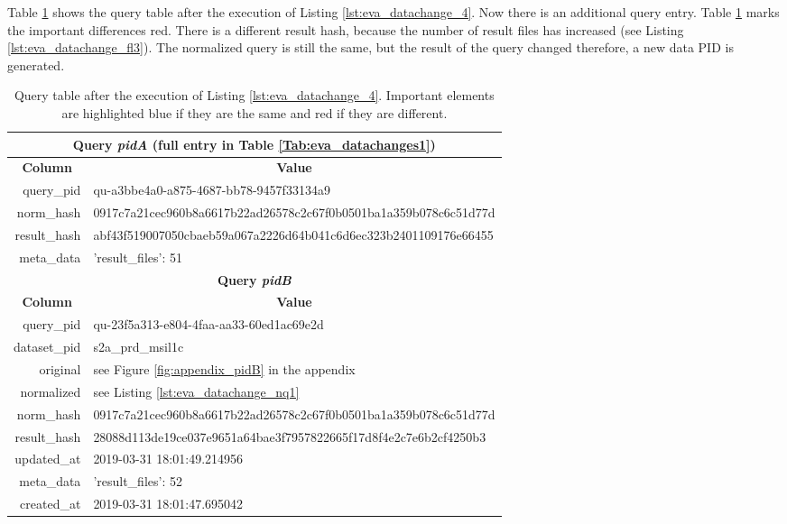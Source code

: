\documentclass[draft,final]{vutinfth} %
\begin{document}
\begin{enumerate}
	Table \ref{Tab:eva_datachanges3} shows the query table after the execution of Listing \ref{lst:eva_datachange_4}. Now there is an additional query entry. Table \ref{Tab:eva_datachanges3} marks the important differences red. There is a different result hash, because the number of result files has increased (see Listing \ref{lst:eva_datachange_fl3}). The normalized query is still the same, but the result of the query changed therefore, a new data PID is generated. 
	\begin{table}[]
		\caption{Query table after the execution of Listing \ref{lst:eva_datachange_4}. Important elements are highlighted blue if they are the same and red if they are different.}
		\centering
		\begin{tabular}{|r|l|}
			\hline \multicolumn{2}{|c|}{\textbf{Query \textit{pidA} (full entry in Table \ref{Tab:eva_datachanges1})}} \\
			\hline \multicolumn{1}{|c|}{\textbf{Column}}  &  \multicolumn{1}{c|}{\textbf{Value}} \\ \hline
			query\_pid & {\color{red}qu-a3bbe4a0-a875-4687-bb78-9457f33134a9}  \\ 
			norm\_hash & {\color{blue}0917c7a21cec960b8a6617b22ad26578c2c67f0b0501ba1a359b078c6c51d77d}  \\
			result\_hash & {\color{red}abf43f519007050cbaeb59a067a2226d64b041c6d6ec323b2401109176e66455}   \\
			meta\_data & {'result\_files': 51}  \\
			\hline \multicolumn{2}{|c|}{\textbf{Query \textit{pidB}}} \\
			\hline \multicolumn{1}{|c|}{\textbf{Column}}  &  \multicolumn{1}{c|}{\textbf{Value}} \\ \hline
			query\_pid & { \color{red} qu-23f5a313-e804-4faa-aa33-60ed1ac69e2d}  \\ 
			dataset\_pid & s2a\_prd\_msil1c  \\ 
			original & see Figure \ref{fig:appendix_pidB} in the appendix \\
			normalized & see Listing \ref{lst:eva_datachange_nq1}  \\
			norm\_hash & {\color{blue}0917c7a21cec960b8a6617b22ad26578c2c67f0b0501ba1a359b078c6c51d77d}  \\
			result\_hash & {\color{red}28088d113de19ce037e9651a64bae3f7957822665f17d8f4e2c7e6b2cf4250b3 }  \\
			updated\_at & 2019-03-31 18:01:49.214956   \\
			meta\_data & {\color{red}'result\_files': 52}  \\
			created\_at & 2019-03-31 18:01:47.695042   \\ \hline
		\end{tabular}
		\label{Tab:eva_datachanges3}
	\end{table}
	

\end{enumerate}
\end{document}
